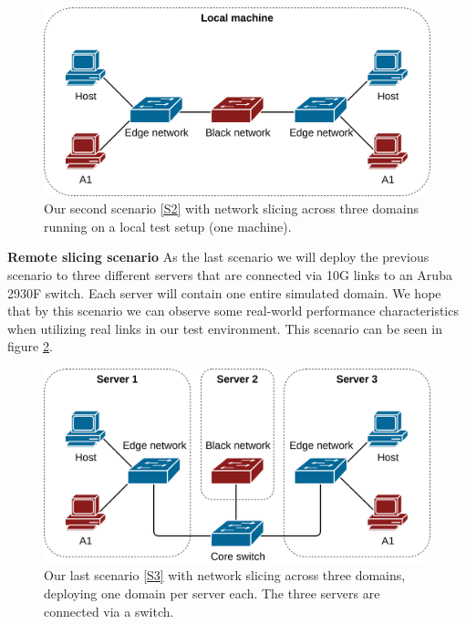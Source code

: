 \begin{description}[style=multiline, labelwidth=0.7cm]
    \begin{figure}[ht]
        \centering
        \includegraphics[width=\textwidth]{images/chapter_7/scenario_2.png}
        \caption[Validation Scenario 2]{Our second scenario \ref{S2} with network slicing across three domains running on a local test setup (one machine).}
        \label{fig:scenario_2}
    \end{figure}
    \item[\namedlabel{S3}{S3}] \textbf{Remote slicing scenario} As the last scenario we will deploy the previous scenario to three different servers that are connected via 10G links to an Aruba 2930F switch. Each server will contain one entire simulated domain. We hope that by this scenario we can observe some real-world performance characteristics when utilizing real links in our test environment. This scenario can be seen in figure \ref{fig:scenario_3}.
    \begin{figure}[ht]
        \centering
        \includegraphics[width=\textwidth]{images/chapter_7/scenario_3.png}
        \caption[Validation Scenario 3]{Our last scenario \ref{S3} with network slicing across three domains, deploying one domain per server each. The three servers are connected via a switch.}
        \label{fig:scenario_3}
    \end{figure}
\end{description}

